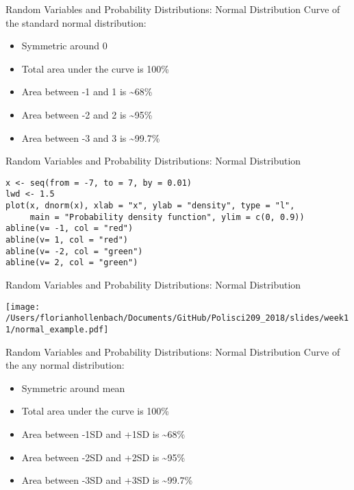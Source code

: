 \documentclass[presentation]{beamer}
\begin{document}
\begin{frame}[label={sec:orgde8f89c}]{Random Variables and Probability Distributions: Normal Distribution}
Curve of the standard normal distribution:

\begin{itemize}
\item Symmetric around 0
\item Total area under the curve is 100\%
\item Area between -1 and 1 is \textasciitilde{}68\%
\item Area between -2 and 2 is \textasciitilde{}95\%
\item Area between -3 and 3 is \textasciitilde{}99.7\%
\end{itemize}
\end{frame}

\begin{frame}[fragile,shrink=30,label={sec:orgfbb04d7}]{Random Variables and Probability Distributions: Normal Distribution}
 \begin{verbatim}
x <- seq(from = -7, to = 7, by = 0.01)
lwd <- 1.5
plot(x, dnorm(x), xlab = "x", ylab = "density", type = "l",
     main = "Probability density function", ylim = c(0, 0.9))
abline(v= -1, col = "red")
abline(v= 1, col = "red")
abline(v= -2, col = "green")
abline(v= 2, col = "green")
\end{verbatim}
\end{frame}



\begin{frame}[label={sec:org307ef66}]{Random Variables and Probability Distributions: Normal Distribution}
\begin{center}
\texttt{[image: /Users/florianhollenbach/Documents/GitHub/Polisci209\_2018/slides/week11/normal\_example.pdf]}
\end{center}
\end{frame}


\begin{frame}[label={sec:org8f8d974}]{Random Variables and Probability Distributions: Normal Distribution}
Curve of the \alert{any} normal distribution:

\begin{itemize}
\item Symmetric around mean
\item Total area under the curve is 100\%
\item Area between -1SD and +1SD is \textasciitilde{}68\%
\item Area between -2SD and +2SD is \textasciitilde{}95\%
\item Area between -3SD and +3SD is \textasciitilde{}99.7\%
\end{itemize}
\end{frame}
\end{document}
